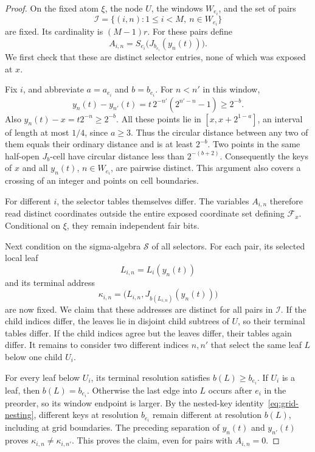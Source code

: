 \begin{proof}
On the fixed atom \(\xi\), the node \(U\), the windows \(W_{e_i}\),
and the set of pairs
\[
 \mathcal I=\{(i,n):1\le i<M,\ n\in W_{e_i}\}
\]
are fixed.  Its cardinality is \((M-1)r\).  For these pairs define
\[
 A_{i,n}=S_{e_i}\bigl(J_{b_{e_i}}(y_n(t))\bigr).
\]
We first check that these are distinct selector entries, none of which
was exposed at \(x\).

Fix \(i\), and abbreviate \(a=a_{e_i}\) and \(b=b_{e_i}\).
For \(n<n'\) in this window,
\[
 y_n(t)-y_{n'}(t)
 =t\,2^{-n'}(2^{n'-n}-1)\ge 2^{-b}.
\]
Also \(y_n(t)-x=t2^{-n}\ge2^{-b}\).
All these points lie in \([x,x+2^{1-a}]\), an interval of length
at most \(1/4\), since \(a\ge3\).
Thus the circular distance between any two of them equals their
ordinary distance and is at least \(2^{-b}\).
Two points in the same half-open \(J_b\)-cell have circular distance
less than \(2^{-(b+2)}\).  Consequently the keys of
\(x\) and all \(y_n(t)\), \(n\in W_{e_i}\), are pairwise distinct.
This argument also covers a crossing of an integer and points on cell
boundaries.

For different \(i\), the selector tables themselves differ.
The variables \(A_{i,n}\) therefore read distinct coordinates outside
the entire exposed coordinate set defining \(\mathcal F_x\).
Conditional on \(\xi\), they remain independent fair bits.

Next condition on the sigma-algebra \(\mathcal S\) of all selectors.
For each pair, its selected local leaf
\[
 L_{i,n}=L_i(y_n(t))
\]
and its terminal address
\[
 \kappa_{i,n}=
 \bigl(L_{i,n},J_{b(L_{i,n})}(y_n(t))\bigr)
\]
are now fixed.  We claim that these addresses are distinct for all
pairs in \(\mathcal I\).
If the child indices differ, the leaves lie in disjoint child subtrees
of \(U\), so their terminal tables differ.
If the child indices agree but the leaves differ, their tables again
differ.  It remains to consider two different indices \(n,n'\) that
select the same leaf \(L\) below one child \(U_i\).

For every leaf below \(U_i\), its terminal resolution satisfies
\(b(L)\ge b_{e_i}\).  If \(U_i\) is a leaf, then \(b(L)=b_{e_i}\).
Otherwise the last edge into \(L\) occurs after \(e_i\) in the preorder,
so its window endpoint is larger.
By the nested-key identity~\eqref{eq:grid-nesting}, different keys at
resolution \(b_{e_i}\) remain different at resolution \(b(L)\),
including at grid boundaries.
The preceding separation of \(y_n(t)\) and \(y_{n'}(t)\) proves
\(\kappa_{i,n}\ne\kappa_{i,n'}\).
This proves the claim, even for pairs with \(A_{i,n}=0\).


\end{proof}
